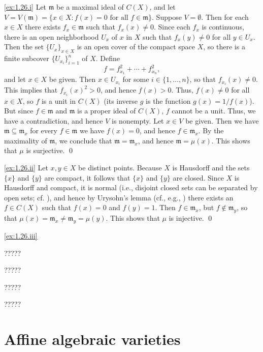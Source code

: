 \noindent
\ref{ex:1.26.i}
Let $\mathfrak m$ be a maximal ideal of $C(X)$, and let $V=V(\mathfrak m) = \{x\in X : f(x) = 0 \text{ for all  } f\in\mathfrak m\}$.
Suppose $V=\emptyset$.
Then for each $x\in X$ there exists $f_x\in\mathfrak m$ such that $f_x(x)\neq 0$.
Since each $f_x$ is continuous, there is an open neighborhood $U_x$ of $x$ in $X$ such that $f_x(y)\neq 0$ for all $y\in U_x$.
Then the set $\{U_x\}_{x\in X}$ is an open cover of the compact space $X$, so there is a finite subcover $\{U_{x_i}\}_{i=1}^n$ of $X$.
Define
\[
f = f_{x_1}^2 + \cdots + f_{x_n}^2,
\]
and let $x\in X$ be given.
Then $x\in U_{x_i}$ for some $i\in\{1,\ldots,n\}$, so that $f_{x_i}(x)\neq 0$.
This implies that $f_{x_i}(x)^2 > 0$, and hence $f(x) > 0$.
Thus, $f(x)\neq 0$ for all $x\in X$, so $f$ is a unit in $C(X)$ (its inverse $g$ is the function $g(x)=1/f(x)$).
But since $f\in\mathfrak m$ and $\mathfrak m$ is a proper ideal of $C(X)$, $f$ cannot be a unit.
Thus, we have a contradiction, and hence $V$ is nonempty.
Let $x\in V$ be given.
Then we have $\mathfrak m \subseteq \mathfrak m_x$ for every $f\in\mathfrak m$ we have $f(x)=0$, and hence $f\in\mathfrak m_x$.
By the maximality of $\mathfrak m$, we conclude that $\mathfrak m = \mathfrak m_x$, and hence $\mathfrak m = \mu(x)$.
This shows that $\mu$ is surjective.
\qed

\noindent
\ref{ex:1.26.ii}
Let $x,y\in X$ be distinct points.
Because $X$ is Hausdorff and the sets $\{x\}$ and $\{y\}$ are compact, it follows that $\{x\}$ and $\{y\}$ are closed.
Since $X$ is Hausdorff and compact, it is normal (i.e., disjoint closed sets can be separated by open sets; cf. \cite[Chapter II, \S3, Theorem 3.5]{LangRealFunctionalAnalysis}), and hence by Urysohn's lemma (cf., e.g., \cite[Chapter II, \S4, Theorem 4.2]{LangRealFunctionalAnalysis}) there exists an $f\in C(X)$ such that $f(x)=0$ and $f(y)=1$.
Then $f\in\mathfrak m_x$, but $f\notin\mathfrak m_y$, so that $\mu(x)=\mathfrak m_x\neq \mathfrak m_y = \mu(y)$.
This shows that $\mu$ is injective.
\qed

\noindent
\ref{ex:1.26.iii}


?????

?????

?????

?????





\section*{Affine algebraic varieties}



